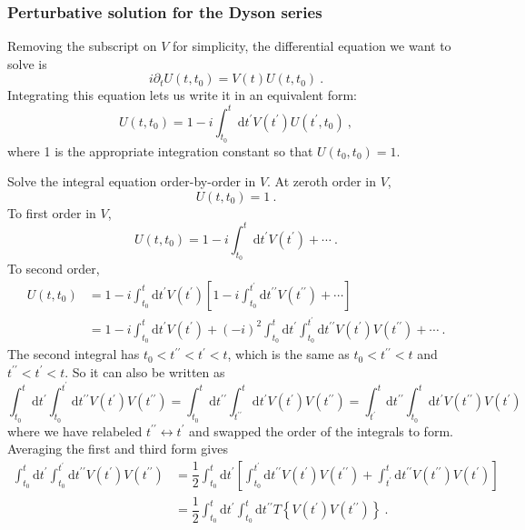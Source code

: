 \documentclass[11pt,a4paper]{article}
\newcommand{\dif}{\mathrm{d}}
\begin{document}
\subsubsection{Perturbative solution for the Dyson series}
Removing the subscript on $V$ for simplicity, the differential equation we want to solve is
\begin{equation}
i \partial_t U(t, t_0) = V(t) U(t, t_0) ~.
\end{equation}
Integrating this equation lets us write it in an equivalent form:
\begin{equation}
U(t, t_0) = 1 -i \int_{t_0}^t \dif t^\prime V(t^\prime) U(t^\prime, t_0) ~,
\end{equation}
where 1 is the appropriate integration constant so that $U(t_0,t_0) = 1$.

Solve the integral equation order-by-order in $V$. At zeroth order in $V$,
\begin{equation}
U(t,t_0) = 1 ~.
\end{equation}
To first order in $V$,
\begin{equation}
U(t,t_0) = 1 -i \int_{t_0}^t \dif t^\prime V(t^\prime) + \cdots ~.
\end{equation}
To second order,
\begin{align}
\nonumber U(t,t_0) &= 1 -i \int_{t_0}^t \dif t^\prime V(t^\prime) \left[1 - i \int_{t_0}^{t^\prime} \dif t^{\prime \prime} V(t^{\prime \prime}) +\cdots  \right] \\
&= 1 -i \int_{t_0}^t \dif t^\prime V(t^\prime) +(-i)^2 \int_{t_0}^{t} \dif t^{\prime} \int_{t_0}^{t^\prime} \dif t^{\prime \prime} V(t^{\prime})V(t^{\prime \prime}) +\cdots ~.
\end{align}
The second integral has $t_0 < t^{\prime \prime} < t^{\prime} < t$, which is the same as $t_0 < t^{\prime \prime} < t$ and $t^{\prime \prime} < t^{ \prime} < t$. So it can also be written as
\begin{equation}
 \int_{t_0}^{t} \dif t^{\prime} \int_{t_0}^{t^\prime} \dif t^{\prime \prime} V(t^{\prime})V(t^{\prime \prime}) = \int_{t_0}^{t} \dif t^{\prime \prime} \int_{t^{\prime\prime} }^{t} \dif t^{\prime} V(t^{\prime})V(t^{\prime \prime}) = \int_{t^{\prime} }^{t} \dif t^{\prime \prime}   \int_{t_0}^{t}  \dif t^{\prime} V(t^{\prime \prime})V(t^{\prime})
\end{equation}
where we have relabeled $t^{\prime\prime} \leftrightarrow t^{\prime}$ and swapped the order of the integrals to form. Averaging the first and third form gives
\begin{align}
\nonumber \int_{t_0}^{t} \dif t^{\prime} \int_{t_0}^{t^\prime} \dif t^{\prime \prime} V(t^{\prime})V(t^{\prime \prime}) &= \dfrac{1}{2}  \int_{t_0}^{t} \dif t^{\prime} \left[ \int_{t_0}^{t^\prime} \dif t^{\prime \prime} V(t^{\prime})V(t^{\prime \prime}) + \int_{t^\prime}^t \dif t^{\prime \prime} V(t^{\prime \prime}) V(t^{\prime}) \right] \\
 &= \dfrac{1}{2}  \int_{t_0}^{t} \dif t^{\prime} \int_{t_0}^t \dif t^{\prime \prime} T\left\{V(t^\prime) V(t^{\prime\prime}) \right\} ~.
\end{align}
\end{document}

